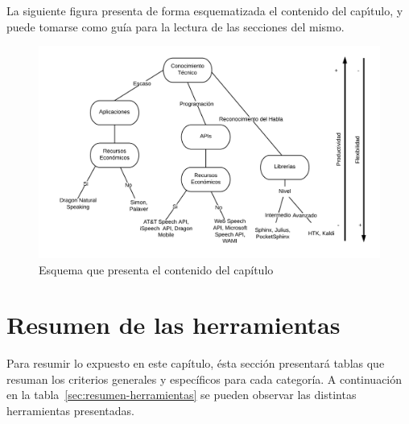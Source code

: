 La siguiente figura presenta de forma esquematizada el contenido del cap{\'\i}tulo, y puede tomarse como
gu\'ia para la lectura de las secciones del mismo.

\begin{figure}[H]
\centering
\includegraphics[width=1\linewidth]{./graphics/esquema-herramientas.png}
\caption{Esquema que presenta el contenido del cap\'itulo}
\label{figure:esquema-herramientas}
\end{figure}





\section{Resumen de las herramientas}

Para resumir lo expuesto en este cap\'itulo, \'esta secci\'on presentar\'a tablas que resuman los criterios generales y espec\'ificos
para cada categor\'ia. A continuaci\'on en la tabla~\ref{sec:resumen-herramientas} se pueden observar las distintas
herramientas presentadas.

